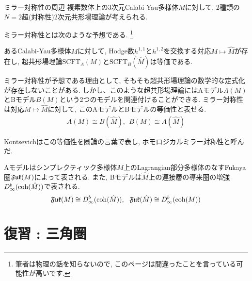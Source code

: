 \documentclass[aspectratio=169, dvipdfmx, 8pt, notheorems, uplatex]{beamer}
\begin{document}
\begin{frame}{ミラー対称性の周辺 \cite{nlab}}
  複素数体上の$3$次元Calabi-Yau多様体$M$に対して, 2種類の$N=2$超(対称性)2次元共形場理論が考えられる.

  ミラー対称性とは次のような予想である. 
  \footnote{
    筆者は物理の話を知らないので, このページは間違ったことを言っている可能性が高いです.
  }

  \begin{conjecture}[ミラー対称性]
    あるCalabi-Yau多様体$M$に対して, Hodge数$h^{1,1}$と$h^{1,2}$を交換する対応$M \mapsto \hat{M}$が存在し, 超共形場理論$\mathrm{SCFT}_A(M)$と$\mathrm{SCFT}_B(\hat{M})$は等価である. 
  \end{conjecture} 

  ミラー対称性が予想である理由として, そもそも超共形場理論の数学的な定式化が存在しないことがある. 
  しかし、このような超共形場理論にはAモデル$A(M)$とBモデル$B(M)$という2つのモデルを関連付けることができる. 
  ミラー対称性は対応$M \mapsto \hat{M}$に対して, このAモデルとBモデルの等価性と表せる. 
  \begin{align*}
    A(M) \cong B(\hat{M}), ~~ B(M) \cong A(\hat{M})
  \end{align*} 

  Kontsevichはこの等価性を圏論の言葉で表し, ホモロジカルミラー対称性と呼んだ. 
  
  \begin{conjecture}[増強としてのホモロジカルミラー対称性]
    Aモデルはシンプレクティック多様体$M$上のLagrangian部分多様体のなすFukaya圏$\mathfrak{Fuk}(M)$によって表される.
    また, Bモデルは$\hat{M}$上の連接層の導来圏の増強$D^b_\infty(\mathrm{coh}(\hat{M}))$で表される. 
    \begin{align*}
      \mathfrak{Fuk}(M) \cong D^b_\infty(\mathrm{coh}(\hat{M})), ~~ \mathfrak{Fuk}(\hat{M}) \cong D^b_\infty(\mathrm{coh}(M))
    \end{align*}
  \end{conjecture}
\end{frame}


\section{復習 : 三角圏}
\end{document}
